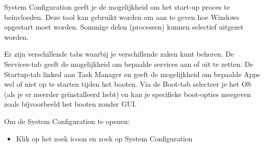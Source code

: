 System Configuration geeft je de mogelijkheid om het start-up proces te be\"invloeden. Deze tool kan gebruikt worden om aan te geven hoe Windows opgestart moet worden. Sommige delen (processen) kunnen selectief uitgezet worden.

Er zijn verschillende tabs waarbij je verschillende zaken kunt beheren. De Services-tab geeft de mogelijkheid om bepaalde services aan of uit te zetten. De Startup-tab linked aan Task Manager en geeft de mogelijkheid om bepaalde Apps wel of niet op te starten tijden het booten. Via de Boot-tab selecteer je het OS (als je er meerder ge\"installeerd hebt) en kan je specifieke boot-opties meegeven zoals bijvoorbeeld het booten zonder GUI.

Om de System Configuration te openen:
\begin{itemize}
\item Klik op het zoek icoon en zoek op System Configuration
\end{itemize}

\begin{minipage}[t]{\linewidth}
\raggedright
{}
\end{minipage}

